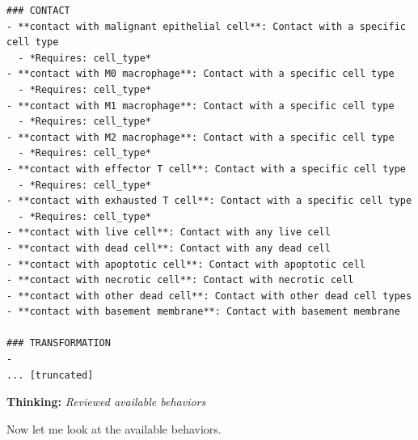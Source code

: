 \documentclass[11pt,a4paper]{article}
\begin{document}
\begin{toolokbox}
\begin{lstlisting}
### CONTACT
- **contact with malignant epithelial cell**: Contact with a specific cell type
  - *Requires: cell_type*
- **contact with M0 macrophage**: Contact with a specific cell type
  - *Requires: cell_type*
- **contact with M1 macrophage**: Contact with a specific cell type
  - *Requires: cell_type*
- **contact with M2 macrophage**: Contact with a specific cell type
  - *Requires: cell_type*
- **contact with effector T cell**: Contact with a specific cell type
  - *Requires: cell_type*
- **contact with exhausted T cell**: Contact with a specific cell type
  - *Requires: cell_type*
- **contact with live cell**: Contact with any live cell
- **contact with dead cell**: Contact with any dead cell
- **contact with apoptotic cell**: Contact with apoptotic cell
- **contact with necrotic cell**: Contact with necrotic cell
- **contact with other dead cell**: Contact with other dead cell types
- **contact with basement membrane**: Contact with basement membrane

### TRANSFORMATION
-
... [truncated]
\end{lstlisting}
\end{toolokbox}
\begin{thinkbox}
\textbf{Thinking:} \textit{Reviewed available behaviors}

Now let me look at the available behaviors.

\end{thinkbox}
\end{document}
